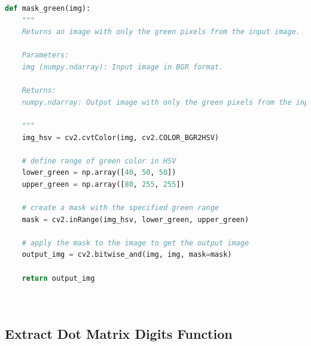 \begin{lstlisting}[language=Python, caption=Mask Green Function]
    def mask_green(img):
    """
    Returns an image with only the green pixels from the input image.
    
    Parameters:
    img (numpy.ndarray): Input image in BGR format.
    
    Returns:
    numpy.ndarray: Output image with only the green pixels from the input image.
    
    """
    img_hsv = cv2.cvtColor(img, cv2.COLOR_BGR2HSV)
    
    # define range of green color in HSV
    lower_green = np.array([40, 50, 50])
    upper_green = np.array([80, 255, 255])
    
    # create a mask with the specified green range
    mask = cv2.inRange(img_hsv, lower_green, upper_green)
    
    # apply the mask to the image to get the output image
    output_img = cv2.bitwise_and(img, img, mask=mask)
    
    return output_img
    
    
\end{lstlisting}
\newpage
\subsection{Extract Dot Matrix Digits Function}

